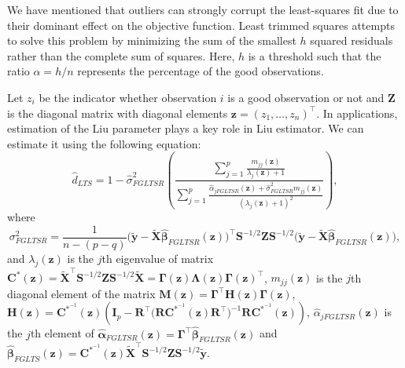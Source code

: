 \documentclass[twoside]{article}
\begin{document}
We have mentioned that outliers can strongly corrupt the least-squares fit due to their dominant effect on the objective function.
Least trimmed squares attempts to solve this problem by minimizing the sum of the smallest $h$ squared residuals rather
than the complete sum of squares. Here, $h$ is a threshold such that the ratio $\alpha=h/n$ represents the percentage of the good observations.

Let $z_i$ be the indicator whether observation $i$ is a good
observation or not and $\boldsymbol Z$ is the diagonal matrix with diagonal elements $\boldsymbol z=(z_{1},\ldots,z_{n})^\top$.
In applications, estimation of the Liu parameter plays a key role in Liu estimator. We can estimate it using the following equation:
$$\hat d_{LTS}=1-\hat\sigma^2_{FGLTSR}\left(\frac{\sum_{j=1}^p\frac{ m_{jj}(\boldsymbol z)}{\lambda_{j}(\boldsymbol z)+1}}{\sum_{j=1}^p\frac{\hat\alpha_{jFGLTSR}(\boldsymbol z)+\hat\sigma^2_{FGLTSR}m_{jj}(\boldsymbol z)  }{(\lambda_{j}(\boldsymbol z)+1)^2}}\right),$$
where
$$\sigma^2_{FGLTSR}=\frac{1}{n-(p-q)}\big(\widetilde{\boldsymbol y}-\widetilde{\boldsymbol X}\hat{\boldsymbol\beta}_{FGLTSR}(\boldsymbol z)\big)^\top\boldsymbol S^{-1/2}\boldsymbol Z\boldsymbol S^{-1/2}\big(\widetilde{\boldsymbol y}-\widetilde{\boldsymbol X} \hat{\boldsymbol\beta}_{FGLTSR}(\boldsymbol z)\big),$$
and $\lambda_{j}(\boldsymbol z)$ is the $j$th eigenvalue of matrix $\boldsymbol C^*(\boldsymbol z)=\widetilde{\boldsymbol X}^\top\boldsymbol S^{-1/2}\boldsymbol Z\boldsymbol S^{-1/2}\widetilde{\boldsymbol X}=\boldsymbol\Gamma(\boldsymbol z)\boldsymbol\Lambda(\boldsymbol z)\boldsymbol\Gamma(\boldsymbol z)^\top$, $m_{jj}(\boldsymbol z)$ is the $j$th diagonal element of the matrix $\boldsymbol M(\boldsymbol z)=\boldsymbol\Gamma^\top\boldsymbol H(\boldsymbol z)\boldsymbol\Gamma(\boldsymbol z)$,
$\boldsymbol H(\boldsymbol z)=\boldsymbol C^{*^{-1}}(\boldsymbol z)\left(\boldsymbol I_p-\boldsymbol R^{\top}\big(\boldsymbol R\boldsymbol C^{*^{-1}}(\boldsymbol z)\boldsymbol R^{\top}\big)^{-1}\boldsymbol R\boldsymbol C^{*^{-1}}(\boldsymbol z)\right)$,  $\hat\alpha_{jFGLTSR}(\boldsymbol z)$ is the $j$th element of $\hat{\boldsymbol\alpha}_{FGLTSR}(\boldsymbol z)=\boldsymbol\Gamma^\top\hat{\boldsymbol\beta}_{FGLTSR}(\boldsymbol z)$ and $\hat{\boldsymbol\beta}_{FGLTS}(\boldsymbol z)=\boldsymbol C^{*^{-1}}(\boldsymbol z)\widetilde{\boldsymbol X}^\top\boldsymbol S^{-1/2}\boldsymbol Z\boldsymbol S^{-1/2}\widetilde{\boldsymbol y}$.
\end{document}
